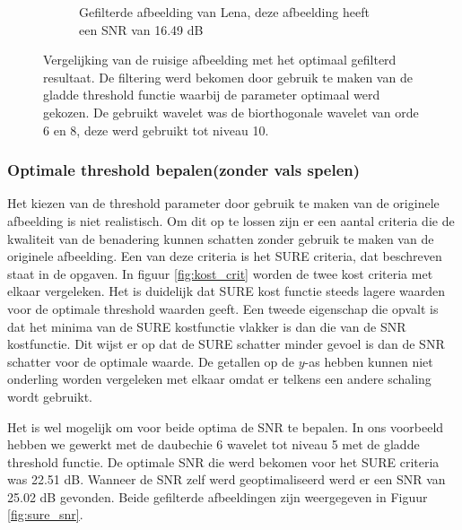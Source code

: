 \begin{figure}
\begin{subfigure}[b]{0.4\textwidth}
        \caption{Gefilterde afbeelding van Lena, deze afbeelding heeft een SNR van 16.49 dB }
        \label{fig:opt_lena}
    \end{subfigure}
    \caption{Vergelijking van de ruisige afbeelding met het optimaal gefilterd resultaat. De filtering werd bekomen door gebruik te maken van de gladde threshold functie waarbij de parameter optimaal werd gekozen. De gebruikt wavelet was de biorthogonale wavelet van orde 6 en 8, deze werd gebruikt tot niveau 10.}\label{fig:optimaleRuisBIOR}
\end{figure}


\subsubsection{Optimale threshold bepalen(zonder vals spelen)}

Het kiezen van de threshold parameter door gebruik te maken van de originele afbeelding is niet realistisch.
Om dit op te lossen zijn er een aantal criteria die de kwaliteit van de benadering kunnen schatten zonder gebruik te maken van de originele afbeelding.
Een van deze criteria is het SURE  criteria, dat beschreven staat in de opgaven.
In figuur \ref{fig:kost_crit}  worden de twee kost criteria met elkaar vergeleken.
Het is duidelijk dat SURE kost functie steeds lagere waarden voor de optimale threshold waarden geeft.
Een tweede eigenschap die opvalt is dat het minima van de SURE kostfunctie vlakker is dan die van de SNR kostfunctie.
Dit wijst er op dat de SURE schatter minder gevoel is dan de SNR schatter voor de optimale waarde.
De getallen op de $ y$-as hebben kunnen niet onderling worden vergeleken met elkaar omdat er telkens een andere schaling wordt gebruikt.

Het is wel mogelijk om voor beide optima de SNR te bepalen.
In ons voorbeeld hebben we gewerkt met de daubechie 6 wavelet tot niveau 5 met de gladde threshold functie.
De optimale SNR die werd bekomen voor het SURE criteria was 22.51 dB.
Wanneer de SNR zelf werd geoptimaliseerd werd er een SNR van 25.02 dB gevonden.
Beide gefilterde afbeeldingen zijn weergegeven in Figuur \ref{fig:sure_snr}.



